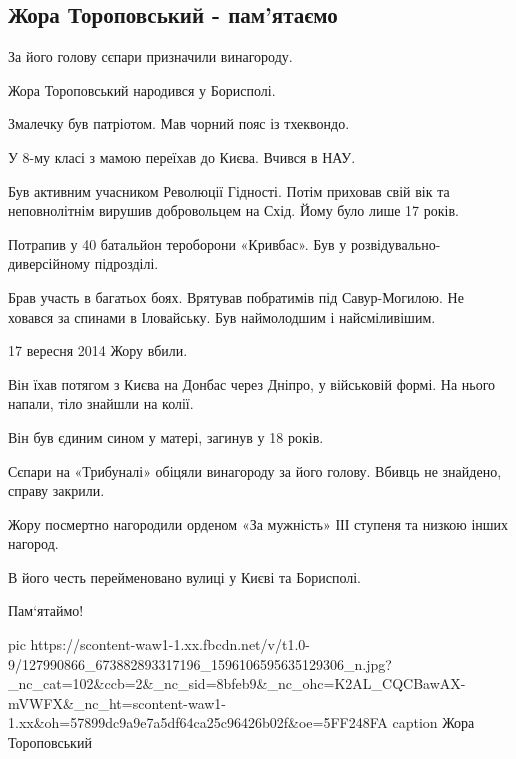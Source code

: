  
 
 
 
 

\subsection{Жора Тороповський - пам'ятаємо}
\label{sec:27_11_2020.fb.i_love_ukraine.1.zhora_toropovskii}


За його голову сєпари призначили винагороду.

Жора Тороповський народився у Борисполі.

Змалечку був патріотом. Мав чорний пояс із тхеквондо. 

У 8-му класі з мамою переїхав до Києва. Вчився в НАУ.

Був активним учасником Революції Гідності. Потім приховав свій вік та
неповнолітнім вирушив добровольцем на Схід. Йому було лише 17 років.

Потрапив у 40 батальйон тероборони «Кривбас». Був у розвідувально-диверсійному підрозділі.

Брав участь в багатьох боях. Врятував побратимів під Савур-Могилою. Не ховався
за спинами в Іловайську. Був наймолодшим і найсміливішим.

17 вересня 2014 Жору вбили.

Він їхав потягом з Києва на Донбас через Дніпро, у військовій формі. На нього
напали, тіло знайшли на колії.

Він був єдиним сином у матері, загинув у 18 років.

Сєпари на «Трибуналі» обіцяли винагороду за його голову. Вбивць не знайдено, справу закрили.

Жору посмертно нагородили орденом «За мужність» ІІІ ступеня та низкою інших нагород.

В його честь перейменовано вулиці у Києві та Борисполі.

Пам‘ятаймо!

\ifcmt
pic https://scontent-waw1-1.xx.fbcdn.net/v/t1.0-9/127990866_673882893317196_1596106595635129306_n.jpg?_nc_cat=102&ccb=2&_nc_sid=8bfeb9&_nc_ohc=K2AL_CQCBawAX-mVWFX&_nc_ht=scontent-waw1-1.xx&oh=57899dc9a9e7a5df64ca25c96426b02f&oe=5FF248FA
caption Жора Тороповський
\fi
